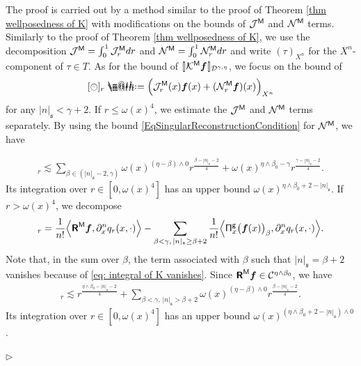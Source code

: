 \documentclass[10pt, reqno]{amsart}
\makeatletter
\numberwithin{subsection}{section}
\numberwithin{subsubsection}{subsection}
\numberwithin{equation}{section} %
\newenvironment{Dem}[1][\unskip]{%
    \begin{list}{\hspace{1.15cm}{\sf \textbf{{\small Proof #1 --}}}}{%
        \setlength{\topsep}{0pt}%
        \setlength{\leftmargin}{0pt}%
        \setlength{\rightmargin}{0pt}%
        \setlength{\listparindent}{0pt}%
        \setlength{\itemindent}{0pt}%
        \setlength{\parsep}{0pt}%
        \addtolength{\leftmargin}{0pt}%
        \addtolength{\rightmargin}{0pt}%
    } \item }{\hfill $\rhd$\end{list}\smallskip}
\theoremstyle{mystyle}
\theoremstyle{mystyle2}
\theoremstyle{mystyle3}
\newcommand{\brarb}[1]{[\hspace{-0.5mm}]#1[\hspace{-0.5mm}]}
\newcommand{\bsf}{\boldsymbol{f}}
\newcommand{\mfs}{\mathfrak{s}}
\newcommand{\mcC}{\mathcal{C}}
\newcommand{\mcD}{\mathcal{D}}
\newcommand{\mcJ}{\mathcal{J}}
\newcommand{\mcK}{\mathcal{K}}
\newcommand{\mcN}{\mathcal{N}}
\newcommand*{\defeq}{\mathrel{\rlap{%
                     \raisebox{0.3ex}{$\m@th\cdot$}}%
                     \raisebox{-0.3ex}{$\m@th\cdot$}}%
                     =}
\makeatother
\begin{document}
\begin{Dem}[of Theorem \ref{thm wellposedness of K}']
The proof is carried out by a method similar to the proof of Theorem \ref{thm wellposedness of K} with modifications on the bounds of $\mcJ^{\sf M}$ and $\mcN^{\sf M}$ terms.
Similarly to the proof of Theorem \ref{thm wellposedness of K}, we use the decomposition $\mcJ^{\sf M}=\int_0^1\mcJ^{\sf M}_rdr$ and $\mcN^{\sf M}=\int_0^1\mcN^{\sf M}_rdr$ and write $(\tau)_{X^n}$ for the $X^n$-component of $\tau\in T$. As for the bound of $\brarb{\mcK^{\sf M}\bsf}_{\mcD^{\gamma,\eta}}$, we focus on the bound of
$$
[\circleddash]_r \defeq  
\Big( \mcJ^{\sf M}_r(x)\bsf(x) + (\mcN^{\sf M}_r\bsf)(x)\Big)_{X^n}
$$
for any $|n|_\mfs<\gamma+2$.
If $r\le\omega(x)^4$, we estimate the $\mcJ^{\sf M}$ and $\mcN^{\sf M}$ terms separately. By using the bound \eqref{EqSingularReconstructionCondition} for $\mcN^{\sf M}$, we have

\begin{align*}
[\circleddash]_r\lesssim\sum_{\beta\in(|n|_\mfs-2,\gamma)}\omega(x)^{(\eta-\beta)\wedge0}r^{\frac{\beta-|n|_\mfs-2}4}+\omega(x)^{\eta\wedge\beta_0-\gamma}r^{\frac{\gamma-|n|_\mfs-2}4}.
\end{align*}
Its integration over $r\in[0,\omega(x)^4]$ has an upper bound $\omega(x)^{\eta\wedge\beta_0+2-|n|_\mfs}$.
If $r>\omega(x)^4$, we decompose
\begin{align*}
[\circleddash]_r =\frac1{n!}\Big\langle\textbf{\textsf{R}}^{\sf M}\bsf,\partial_x^nq_r(x,\cdot)\Big\rangle
-\sum_{\beta<\gamma,\,|n|_\mfs\ge\beta+2}\frac1{n!}\Big\langle{\sf\Pi}_x^{\sf g}\big(\bsf(x)\big)_\beta,\partial_x^nq_r(x,\cdot)\Big\rangle.
\end{align*}
Note that, in the sum over $\beta$, the term associated with $\beta$ such that $|n|_\mfs=\beta+2$ vanishes because of \eqref{eq: integral of K vanishes}.
Since $\textbf{\textsf{R}}^{\sf M}\bsf\in\mcC^{\eta\wedge\beta_0}$, we have
\begin{align*}
[\circleddash]_r \lesssim r^{\frac{\eta\wedge\beta_0-|n|_\mfs-2}4}
+\sum_{\beta<\gamma,\,|n|_\mfs>\beta+2}\omega(x)^{(\eta-\beta)\wedge0}r^{\frac{\beta-|n|_\mfs-2}4}.
\end{align*}
Its integration over $r\in[0,\omega(x)^4]$ has an upper bound $\omega(x)^{(\eta\wedge\beta_0+2-|n|_\mfs)\wedge0}$.


\end{Dem}
\end{document}
